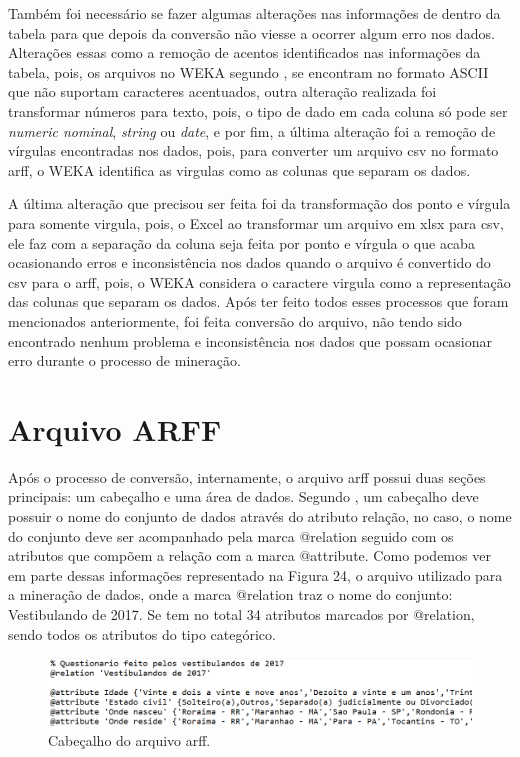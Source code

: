 \par
Também foi necessário se fazer algumas alterações nas informações de dentro da tabela para que depois da conversão não viesse a ocorrer algum erro nos dados. Alterações essas como a remoção de acentos identificados nas informações da tabela, pois, os arquivos no WEKA segundo , se encontram no formato ASCII que não suportam caracteres acentuados, outra alteração realizada foi transformar números para texto, pois, o tipo de dado em cada coluna só pode ser \textit{numeric nominal}, \textit{string} ou \textit{date}, e por fim, a última alteração foi a remoção de vírgulas encontradas nos dados, pois, para converter um arquivo csv no formato arff, o WEKA identifica as virgulas como as colunas que separam os dados.

\par
A última alteração que precisou ser feita foi da transformação dos ponto e vírgula para somente virgula, pois, o Excel ao transformar um arquivo em xlsx para csv, ele faz com a separação da coluna seja feita por ponto e vírgula o que acaba ocasionando erros e inconsistência nos dados quando o arquivo é convertido do csv para o arff, pois, o WEKA considera o caractere virgula como a representação das colunas que separam os dados. Após ter feito todos esses processos que foram mencionados anteriormente, foi feita conversão do arquivo, não tendo sido encontrado nenhum problema e inconsistência nos dados que possam ocasionar erro durante o processo de mineração.


\section{Arquivo ARFF}

\par
Após o processo de conversão, internamente, o arquivo arff possui duas seções principais: um cabeçalho e uma área de dados. Segundo , um cabeçalho deve possuir o nome do conjunto de dados através do atributo relação, no caso, o nome do conjunto deve ser acompanhado pela marca @relation seguido com os atributos que compõem a relação com a marca @attribute. Como podemos ver em parte dessas informações representado na Figura 24, o arquivo utilizado para a mineração de dados, onde a marca @relation traz o nome do conjunto: Vestibulando de 2017. Se tem no total 34 atributos marcados por @relation, sendo todos os atributos do tipo categórico.

\par
\begin{figure}[!htp]
	\begin{center}
    \caption{\label{fig:waveform_fig} Cabeçalho do arquivo arff.}
	\includegraphics[scale=0.57]{Figuras/arquivo_arff.png}
	\end{center}
\end{figure}

